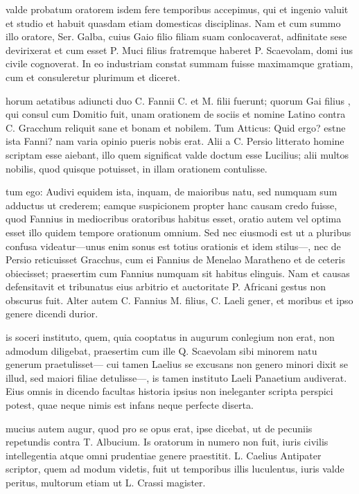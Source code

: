  valde probatum oratorem isdem fere temporibus accepimus, qui et ingenio valuit et studio et habuit quasdam etiam domesticas disciplinas. Nam et cum summo illo oratore, Ser. Galba, cuius Gaio filio filiam suam conlocaverat, adfinitate sese devirixerat et cum esset P. Muci filius fratremque haberet P. Scaevolam, domi ius civile cognoverat. In eo industriam constat summam fuisse maximamque gratiam, cum et consuleretur plurimum et diceret.

 horum aetatibus adiuncti duo C. Fannii C. et M. filii fuerunt; quorum Gai filius , qui consul cum Domitio fuit, unam orationem de sociis et nomine Latino contra C. Gracchum reliquit sane et bonam et nobilem. Tum Atticus: Quid ergo? estne ista Fanni? nam varia opinio pueris nobis erat. Alii a C. Persio litterato homine scriptam esse aiebant, illo quem significat valde doctum esse Lucilius; alii multos nobilis, quod quisque potuisset, in illam orationem contulisse.

 tum ego: Audivi equidem ista, inquam, de maioribus natu, sed numquam sum adductus ut crederem; eamque suspicionem propter hanc causam credo fuisse, quod Fannius in mediocribus oratoribus habitus esset, oratio autem vel optima esset illo quidem tempore orationum omnium. Sed nec eiusmodi est ut a pluribus confusa videatur—unus enim sonus est totius orationis et idem stilus—, nec de Persio reticuisset Gracchus, cum ei Fannius de Menelao Maratheno et de ceteris obiecisset; praesertim cum Fannius numquam sit habitus elinguis. Nam et causas defensitavit et tribunatus eius arbitrio et auctoritate P. Africani gestus non obscurus fuit. Alter autem C. Fannius M. filius, C. Laeli gener, et moribus et ipso genere dicendi durior.

 is soceri instituto, quem, quia cooptatus in augurum conlegium non erat, non admodum diligebat, praesertim cum ille Q. Scaevolam sibi minorem natu generum praetulisset— cui tamen Laelius se excusans non genero minori dixit se illud, sed maiori filiae detulisse—, is tamen instituto Laeli Panaetium audiverat. Eius omnis in dicendo facultas historia ipsius non ineleganter scripta perspici potest, quae neque nimis est infans neque perfecte diserta.

 mucius autem augur, quod pro se opus erat, ipse dicebat, ut de pecuniis repetundis contra T. Albucium. Is oratorum in numero non fuit, iuris civilis intellegentia atque omni prudentiae genere praestitit. L. Caelius Antipater scriptor, quem ad modum videtis, fuit ut temporibus illis luculentus, iuris valde peritus, multorum etiam ut L. Crassi magister.

